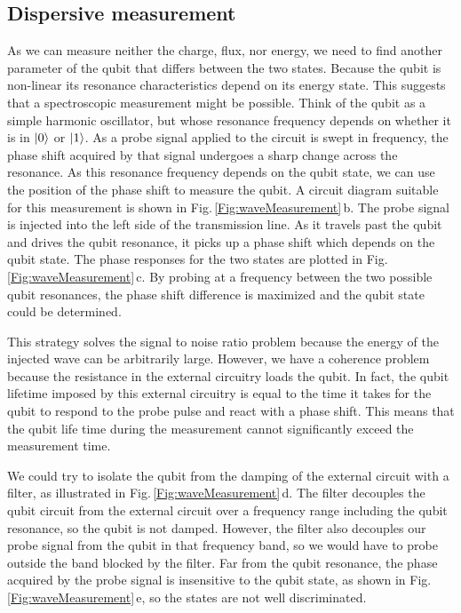 \subsection{Dispersive measurement}

As we can measure neither the charge, flux, nor energy, we need to find another parameter of the qubit that differs between the two states.
Because the qubit is non-linear its resonance characteristics depend on its energy state.
This suggests that a spectroscopic measurement might be possible.
Think of the qubit as a simple harmonic oscillator, but whose resonance frequency depends on whether it is in $|0\rangle$ or $|1\rangle$.
As a probe signal applied to the circuit is swept in frequency, the phase shift acquired by that signal undergoes a sharp change across the resonance.
As this resonance frequency depends on the qubit state, we can use the position of the phase shift to measure the qubit.
A circuit diagram suitable for this measurement is shown in Fig.\,\ref{Fig:waveMeasurement}\,b.
The probe signal is injected into the left side of the transmission line.
As it travels past the qubit and drives the qubit resonance, it picks up a phase shift which depends on the qubit state.
The phase responses for the two states are plotted in Fig.\,\ref{Fig:waveMeasurement}\,c.
By probing at a frequency between the two possible qubit resonances, the phase shift difference is maximized and the qubit state could be determined.

This strategy solves the signal to noise ratio problem because the energy of the injected wave can be arbitrarily large.
However, we have a coherence problem because the resistance in the external circuitry loads the qubit.
In fact, the qubit lifetime imposed by this external circuitry is equal to the time it takes for the qubit to respond to the probe pulse and react with a phase shift.
This means that the qubit life time during the measurement cannot significantly exceed the measurement time.

We could try to isolate the qubit from the damping of the external circuit with a filter, as illustrated in Fig.\,\ref{Fig:waveMeasurement}\,d.
The filter decouples the qubit circuit from the external circuit over a frequency range including the qubit resonance, so the qubit is not damped.
However, the filter also decouples our probe signal from the qubit in that frequency band, so we would have to probe outside the band blocked by the filter.
Far from the qubit resonance, the phase acquired by the probe signal is insensitive to the qubit state, as shown in Fig.\,\ref{Fig:waveMeasurement}\,e, so the states are not well discriminated.

